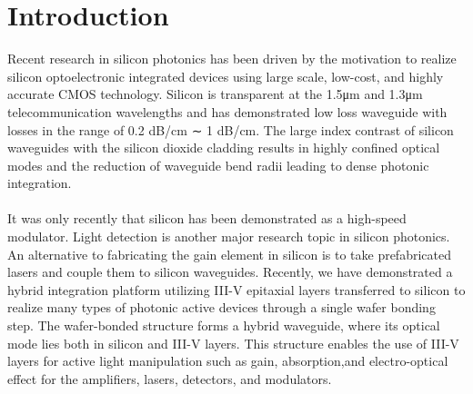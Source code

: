 \documentclass[12pt,a4paper]{report}
\begin{document}
\chapter{Introduction}
Recent  research  in  silicon  photonics  has  been  driven  by the  motivation  to realize  silicon  optoelectronic  integrated devices   using   large   scale,   low-cost,   and   highly   accurate CMOS technology. Silicon is transparent at the 1.5μm and 1.3μm telecommunication  wavelengths  and  has  demonstrated  low  loss  waveguide with  losses  in  the  range  of 0.2 dB/cm ∼ 1 dB/cm.  The  large  index  contrast  of silicon waveguides with the silicon dioxide cladding results in highly confined optical modes and the reduction of waveguide bend radii leading to dense photonic integration.\\ 
\\
It was only recently that silicon has been demonstrated as a high-speed modulator. Light detection is another major research topic in silicon
photonics. An alternative to fabricating the gain element in silicon is to take prefabricated lasers and couple them to silicon waveguides. Recently, we have demonstrated  a  hybrid  integration platform utilizing III-V epitaxial layers transferred to silicon to  realize  many  types  of  photonic  active  devices through a single wafer bonding step. The wafer-bonded structure forms a hybrid waveguide, where its optical mode lies both in silicon and III-V layers. This structure enables the use of III-V layers for active light manipulation such as gain, absorption,and electro-optical effect for the amplifiers, lasers, detectors, and modulators. 
\end{document}
